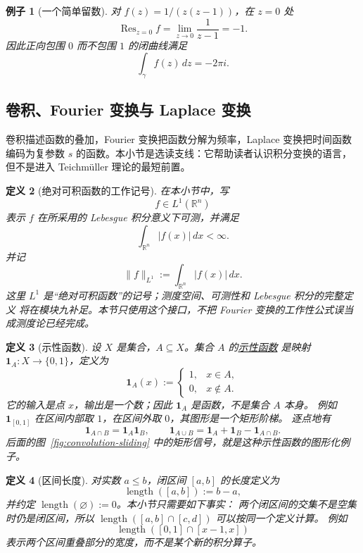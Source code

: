 \documentclass[UTF8,fontset=none,a4paper,11pt]{ctexart}
\theoremstyle{foundation-definition}
\newtheorem{definition}{定义}[section]
\theoremstyle{foundation-theorem}
\theoremstyle{foundation-proposition}
\theoremstyle{foundation-example}
\newtheorem{example}[definition]{例子}
\theoremstyle{foundation-remark}
\theoremstyle{foundation-theorem}
\newcommand{\term}[2]{\hyperref[#1]{#2}}
\begin{document}
\begin{example}[一个简单留数]
对 \(f(z)=1/(z(z-1))\)，在 \(z=0\) 处
\[
\operatorname{Res}_{z=0}f
=\lim_{z\to0}\frac{1}{z-1}=-1.
\]
因此正向包围 \(0\) 而不包围 \(1\) 的闭曲线满足
\[
\int_{\gamma}f(z)\,dz=-2\pi i.
\]
\end{example}

\subsection{卷积、Fourier 变换与 Laplace 变换}

卷积描述函数的叠加，Fourier 变换把函数分解为频率，Laplace 变换把时间函数编码为复参数 \(s\) 的函数。本小节是选读支线：它帮助读者认识积分变换的语言，但不是进入 Teichmüller 理论的最短前置。

\begin{definition}[绝对可积函数的工作记号]\label{def:l1-integrability}
在本小节中，写
\[
  f\in L^1(\mathbb R^n)
\]
表示 \(f\) 在所采用的 Lebesgue 积分意义下可测，并满足
\[
  \int_{\mathbb R^n}|f(x)|\,dx<\infty.
\]
并记
\[
  \|f\|_{L^1}:=\int_{\mathbb R^n}|f(x)|\,dx.
\]
这里 \(L^1\) 是“绝对可积函数”的记号；测度空间、可测性和 Lebesgue 积分的完整定义
将在模块九补足。本节只使用这个接口，不把 Fourier 变换的工作性公式误当成测度论已经完成。
\end{definition}

\begin{definition}[示性函数]\label{def:indicator-function}
设 \(X\) 是集合，\(A\subseteq X\)。集合 \(A\) 的\term{def:indicator-function}{示性函数}
是映射 \(\mathbf 1_A:X\to\{0,1\}\)，定义为
\[
\mathbf 1_A(x):=
\begin{cases}
1,&x\in A,\\
0,&x\notin A.
\end{cases}
\]
它的输入是点 \(x\)，输出是一个数；因此 \(\mathbf 1_A\) 是函数，不是集合 \(A\) 本身。
例如 \(\mathbf 1_{[0,1]}\) 在区间内部取 \(1\)，在区间外取 \(0\)，其图形是一个矩形阶梯。
逐点地有
\[
\mathbf 1_{A\cap B}=\mathbf 1_A\mathbf 1_B,\qquad
\mathbf 1_{A\cup B}=\mathbf 1_A+\mathbf 1_B-\mathbf 1_{A\cap B}.
\]
后面的图~\ref{fig:convolution-sliding} 中的矩形信号，就是这种示性函数的图形化例子。
\end{definition}

\begin{definition}[区间长度]\label{def:interval-length}
对实数 \(a\leq b\)，闭区间 \([a,b]\) 的长度定义为
\[
\operatorname{length}([a,b]):=b-a,
\]
并约定 \(\operatorname{length}(\varnothing):=0\)。本小节只需要如下事实：
两个闭区间的交集不是空集时仍是闭区间，所以
\(\operatorname{length}([a,b]\cap[c,d])\) 可以按同一个定义计算。
例如
\[
\operatorname{length}([0,1]\cap[x-1,x])
\]
表示两个区间重叠部分的宽度，而不是某个新的积分算子。
\end{definition}
\end{document}

